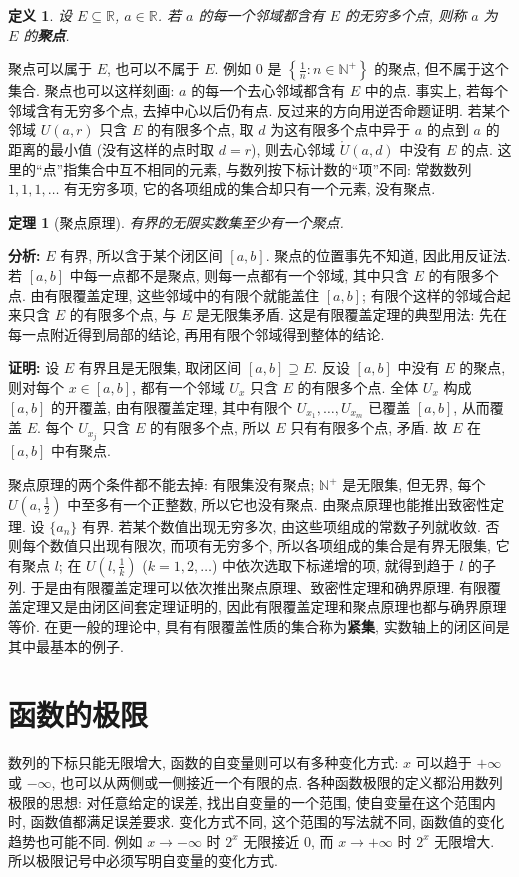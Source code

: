 \documentclass[UTF8,openany]{ctexbook}
\theoremstyle{chinesetextbook}
\newtheorem{definition}{定义}[section]
\newtheorem{theorem}{定理}[section]
\newenvironment{cnproof}{\par\indent\textbf{证明:} \ignorespaces}{\par}
\begin{document}
\begin{definition}
设 $E\subseteq\mathbb R$, $a\in\mathbb R$. 若 $a$ 的每一个邻域都含有 $E$ 的无穷多个点, 则称 $a$ 为 $E$ 的\textbf{聚点}.
\end{definition}
聚点可以属于 $E$, 也可以不属于 $E$. 例如 $0$ 是 $\displaystyle\left\{\frac1n:n\in\mathbb N^+\right\}$ 的聚点, 但不属于这个集合. 聚点也可以这样刻画: $a$ 的每一个去心邻域都含有 $E$ 中的点. 事实上, 若每个邻域含有无穷多个点, 去掉中心以后仍有点. 反过来的方向用逆否命题证明. 若某个邻域 $U(a,r)$ 只含 $E$ 的有限多个点, 取 $d$ 为这有限多个点中异于 $a$ 的点到 $a$ 的距离的最小值 (没有这样的点时取 $d=r$), 则去心邻域 $\mathring U(a,d)$ 中没有 $E$ 的点. 这里的“点”指集合中互不相同的元素, 与数列按下标计数的“项”不同: 常数数列 $1,1,1,\ldots$ 有无穷多项, 它的各项组成的集合却只有一个元素, 没有聚点.
\begin{theorem}[聚点原理]
有界的无限实数集至少有一个聚点.
\end{theorem}
\par\indent\textbf{分析:} $E$ 有界, 所以含于某个闭区间 $[a,b]$. 聚点的位置事先不知道, 因此用反证法. 若 $[a,b]$ 中每一点都不是聚点, 则每一点都有一个邻域, 其中只含 $E$ 的有限多个点. 由有限覆盖定理, 这些邻域中的有限个就能盖住 $[a,b]$; 有限个这样的邻域合起来只含 $E$ 的有限多个点, 与 $E$ 是无限集矛盾. 这是有限覆盖定理的典型用法: 先在每一点附近得到局部的结论, 再用有限个邻域得到整体的结论.
\begin{cnproof}
设 $E$ 有界且是无限集, 取闭区间 $[a,b]\supseteq E$. 反设 $[a,b]$ 中没有 $E$ 的聚点, 则对每个 $x\in[a,b]$, 都有一个邻域 $U_x$ 只含 $E$ 的有限多个点. 全体 $U_x$ 构成 $[a,b]$ 的开覆盖, 由有限覆盖定理, 其中有限个 $U_{x_1},\ldots,U_{x_m}$ 已覆盖 $[a,b]$, 从而覆盖 $E$. 每个 $U_{x_j}$ 只含 $E$ 的有限多个点, 所以 $E$ 只有有限多个点, 矛盾. 故 $E$ 在 $[a,b]$ 中有聚点.
\end{cnproof}
聚点原理的两个条件都不能去掉: 有限集没有聚点; $\mathbb N^+$ 是无限集, 但无界, 每个 $\displaystyle U\left(a,\frac12\right)$ 中至多有一个正整数, 所以它也没有聚点. 由聚点原理也能推出致密性定理. 设 $\{a_n\}$ 有界. 若某个数值出现无穷多次, 由这些项组成的常数子列就收敛. 否则每个数值只出现有限次, 而项有无穷多个, 所以各项组成的集合是有界无限集, 它有聚点 $l$; 在 $\displaystyle U\left(l,\frac1k\right)$ ($k=1,2,\ldots$) 中依次选取下标递增的项, 就得到趋于 $l$ 的子列. 于是由有限覆盖定理可以依次推出聚点原理、致密性定理和确界原理. 有限覆盖定理又是由闭区间套定理证明的, 因此有限覆盖定理和聚点原理也都与确界原理等价. 在更一般的理论中, 具有有限覆盖性质的集合称为\textbf{紧集}, 实数轴上的闭区间是其中最基本的例子.
\section{函数的极限}
数列的下标只能无限增大, 函数的自变量则可以有多种变化方式: $x$ 可以趋于 $+\infty$ 或 $-\infty$, 也可以从两侧或一侧接近一个有限的点. 各种函数极限的定义都沿用数列极限的思想: 对任意给定的误差, 找出自变量的一个范围, 使自变量在这个范围内时, 函数值都满足误差要求. 变化方式不同, 这个范围的写法就不同, 函数值的变化趋势也可能不同. 例如 $x\to-\infty$ 时 $2^x$ 无限接近 $0$, 而 $x\to+\infty$ 时 $2^x$ 无限增大. 所以极限记号中必须写明自变量的变化方式.
\end{document}
